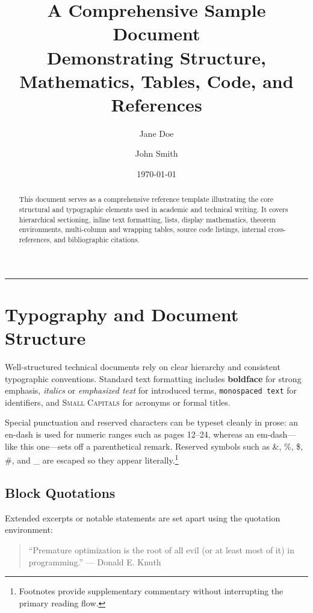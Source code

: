 \documentclass[11pt, a4paper]{article}
\title{\textbf{A Comprehensive Sample Document}\\
\large Demonstrating Structure, Mathematics, Tables, Code, and References}
\author{Jane Doe \and John Smith}
\date{\today}
\theoremstyle{plain}
\theoremstyle{definition}
\theoremstyle{remark}
\begin{document}
\maketitle

\begin{abstract}
This document serves as a comprehensive reference template illustrating the core structural and typographic elements used in academic and technical writing. It covers hierarchical sectioning, inline text formatting, lists, display mathematics, theorem environments, multi-column and wrapping tables, source code listings, internal cross-references, and bibliographic citations.
\end{abstract}

\tableofcontents
\vspace{1em}
\hrule
\vspace{1.5em}

\section{Typography and Document Structure}
\label{sec:typography}

Well-structured technical documents rely on clear hierarchy and consistent typographic conventions. Standard text formatting includes \textbf{boldface} for strong emphasis, \textit{italics} or \emph{emphasized text} for introduced terms, \texttt{monospaced text} for identifiers, and \textsc{Small Capitals} for acronyms or formal titles.

Special punctuation and reserved characters can be typeset cleanly in prose: an en-dash is used for numeric ranges such as pages 12--24, whereas an em-dash---like this one---sets off a parenthetical remark. Reserved symbols such as \&, \%, \$, \#, and \_ are escaped so they appear literally.\footnote{Footnotes provide supplementary commentary without interrupting the primary reading flow.}

\subsection{Block Quotations}
\label{subsec:quotes}

Extended excerpts or notable statements are set apart using the quotation environment:

\begin{quote}
``Premature optimization is the root of all evil (or at least most of it) in programming.'' --- Donald E. Knuth \cite{knuth1984}
\end{quote}
\end{document}
